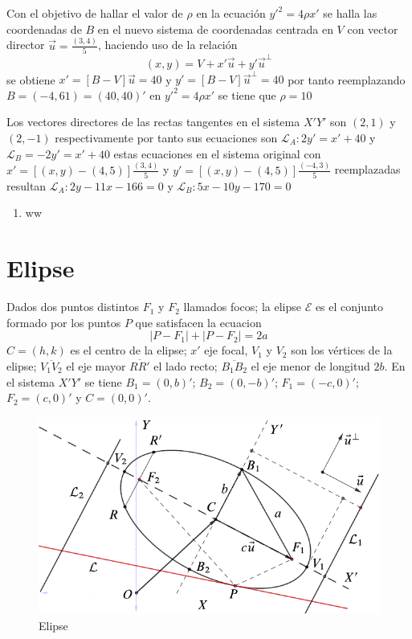 \documentclass[10pt,]{krantz}
\providecommand{\tightlist}{%
  \setlength{\itemsep}{0pt}\setlength{\parskip}{0pt}}
\let\oldincludegraphics\includegraphics
\renewcommand\includegraphics[2][]{%
  \oldincludegraphics[scale=0.85]{#2}
}
\theoremstyle{definition}
\theoremstyle{definition}
\theoremstyle{definition}
\theoremstyle{remark}
\begin{document}
Con el objetivo de hallar el valor de \(\rho\) en la ecuación \(y'^2=4\rho x'\) se halla las coordenadas de \(B\) en el nuevo sistema de coordenadas centrada en \(V\) con vector director \(\vec{u}=\frac{(3,4)}{5}\), haciendo uso de la relación \[(x,y)=V+x'\vec{u}+y'\vec{u}^\perp\] se obtiene \(x'=\left[B-V\right]\vec{u}=40\) y \(y'=\left[B-V\right]\vec{u}^\perp=40\) por tanto reemplazando \(B=(-4,61)=(40,40)'\) en \(y'^2=4\rho x'\) se tiene que \(\rho=10\)

Los vectores directores de las rectas tangentes en el sistema \(X'Y'\) son \((2,1)\) y \((2,-1)\) respectivamente por tanto sus ecuaciones son \(\mathcal{L}_A: 2y'=x'+40\) y \(\mathcal{L}_B=-2y'=x'+40\) estas ecuaciones en el sistema original con \(x'=\left[(x,y)-(4,5)\right]\frac{(3,4)}{5}\) y \(y'=\left[(x,y)-(4,5)\right]\frac{(-4,3)}{5}\) reemplazadas resultan \(\mathcal{L}_A:2y-11x-166=0\) y \(\mathcal{L}_B:5x-10y-170=0\)

\begin{enumerate}
\def\labelenumi{\arabic{enumi}.}
\tightlist
\item
  ww
\end{enumerate}

\hypertarget{elipse}{%
\chapter{Elipse}\label{elipse}}

Dados dos puntos distintos \(F_1\) y \(F_2\) llamados focos; la elipse \(\mathcal{E}\) es el conjunto formado por los puntos \(P\) que satisfacen la ecuacion
\begin{equation} 
\left|P-F_1\right|+\left|P-F_2\right|=2a
\label{eq:binom}
\end{equation}
\(C=(h,k)\) es el centro de la elipse; \(x'\) eje focal, \(V_1\) y \(V_2\) son los vértices de la elipse; \(\overline{V_1V_2}\) el eje mayor \(\overline{RR'}\) el lado recto; \(\overline{B_1B_2}\) el eje menor de longitud \(2b\). En el sistema \(X'Y'\) se tiene \(B_1=(0,b)'\); \(B_2=(0,-b)'\); \(F_1=(-c,0)'\); \(F_2=(c,0)'\) y \(C=(0,0)'\).

\begin{figure}

{\centering \includegraphics{elipse} 

}

\caption{Elipse}\label{fig:pressure1}
\end{figure}
\end{document}
